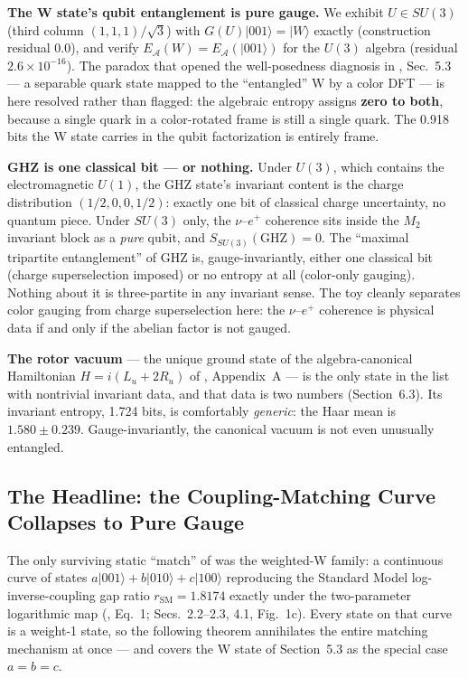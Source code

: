 \documentclass[11pt]{article}
\newcommand{\EA}{E_{\mathcal{A}}}
\newcommand{\rSM}{r_{\mathrm{SM}}}
\begin{document}
\textbf{The W state's qubit entanglement is pure gauge.} We exhibit $U \in SU(3)$ (third column $(1,1,1)/\sqrt{3}$) with $G(U)|001\rangle = |W\rangle$ exactly (construction residual $0.0$), and verify $\EA(W) = \EA(|001\rangle)$ for the $U(3)$ algebra (residual $2.6 \times 10^{-16}$). The paradox that opened the well-posedness diagnosis in \cite{companion}, Sec.~5.3 --- a separable quark state mapped to the ``entangled'' W by a color DFT --- is here resolved rather than flagged: the algebraic entropy assigns \textbf{zero to both}, because a single quark in a color-rotated frame is still a single quark. The 0.918 bits the W state carries in the qubit factorization is entirely frame.

\textbf{GHZ is one classical bit --- or nothing.} Under $U(3)$, which contains the electromagnetic $U(1)$, the GHZ state's invariant content is the charge distribution $(1/2, 0, 0, 1/2)$: exactly one bit of classical charge uncertainty, no quantum piece. Under $SU(3)$ only, the $\nu$--$e^+$ coherence sits inside the $M_2$ invariant block as a \emph{pure} qubit, and $S_{SU(3)}(\mathrm{GHZ}) = 0$. The ``maximal tripartite entanglement'' of GHZ is, gauge-invariantly, either one classical bit (charge superselection imposed) or no entropy at all (color-only gauging). Nothing about it is three-partite in any invariant sense. The toy cleanly separates color gauging from charge superselection here: the $\nu$--$e^+$ coherence is physical data if and only if the abelian factor is not gauged.

\textbf{The rotor vacuum} --- the unique ground state of the algebra-canonical Hamiltonian $H = i(L_u + 2R_u)$ of \cite{companion}, Appendix~A --- is the only state in the list with nontrivial invariant data, and that data is two numbers (Section~6.3). Its invariant entropy, 1.724 bits, is comfortably \emph{generic}: the Haar mean is $1.580 \pm 0.239$. Gauge-invariantly, the canonical vacuum is not even unusually entangled.

\subsection{The Headline: the Coupling-Matching Curve Collapses to Pure Gauge}

The only surviving static ``match'' of \cite{companion} was the weighted-W family: a continuous curve of states $a|001\rangle + b|010\rangle + c|100\rangle$ reproducing the Standard Model log-inverse-coupling gap ratio $\rSM = 1.8174$ exactly under the two-parameter logarithmic map (\cite{companion}, Eq.~1; Secs.~2.2--2.3, 4.1, Fig.~1c). Every state on that curve is a weight-1 state, so the following theorem annihilates the entire matching mechanism at once --- and covers the W state of Section~5.3 as the special case $a = b = c$.
\end{document}
